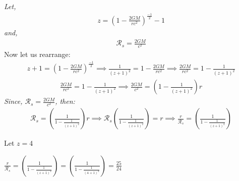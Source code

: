 \documentclass{article}
\begin{document}
\textit{Let,}
\begin{gather*}
	z = {\left(1-\frac{2GM}{rc^2}\right)^{\frac{-1}{2}} - 1}
\end{gather*}
\textit{and,}
\begin{gather*}
	\mathcal{R}_s = \frac{2GM}{c^2}
\end{gather*}
Now let us rearrange:
\begin{gather*}
	z+1 =  {\left(1-\frac{2GM}{rc^2}\right)^{\frac{-1}{2}} \implies \frac{1}{(z+1)^2} = 1 - \frac{2GM}{rc^2} \implies \frac{2GM}{rc^2} = 1 - \frac{1}{(z+1)^2} }
\end{gather*}
\begin{gather*}
	\frac{2GM}{rc^2} = 1 - \frac{1}{(z+1)^2} \implies \frac{2GM}{c^2} = \left(1-\frac{1}{(z+1)^2}\right)r
\end{gather*}
\textit{Since, $\mathcal{R}_s = \frac{2GM}{c^2}$, then:}
\begin{gather*}
	\mathcal{R}_s =  \left(\frac{1}{1-\frac{1}{(z+1)^2}}\right)r \implies \mathcal{R}_s\left(\frac{1}{1-\frac{1}{(z+1)^2}}\right) = r \implies \frac{r}{\mathcal{R}_s} = \left(\frac{1}{1-\frac{1}{(z+1)^2}}\right) 
\end{gather*}

Let $z = 4$
\begin{center}
	$\boxed{\frac{r}{\mathcal{R}_s} = \left(\frac{1}{1-\frac{1}{(z+1)^2}}\right) = \left(\frac{1}{1-\frac{1}{(4+1)^2}}\right) = \frac{25}{24}}
	$
\end{center}
\end{document}
